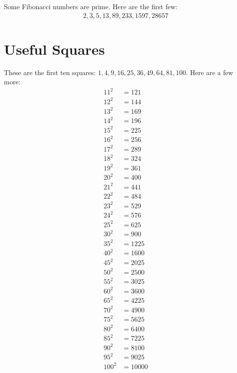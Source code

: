 \documentclass[12pt]{article}
\begin{document}
Some Fibonacci numbers are prime. Here are the first few:
\begin{align*}
2, 3, 5, 13, 89, 233, 1597, 28657
\end{align*}

\section*{Useful Squares}
These are the first ten squares: $1, 4, 9, 16, 25, 36, 49, 64, 81, 100$. Here are a few more:
\begin{align*}
11^2  & = 121\\
12^2  & = 144\\
13^2  & = 169\\
14^2  & = 196\\
15^2  & = 225\\
16^2  & = 256\\
17^2  & = 289\\
18^2  & = 324\\
19^2  & = 361\\
20^2  & = 400\\
21^2  & = 441\\
22^2  & = 484\\
23^2  & = 529\\
24^2  & = 576\\
25^2  & = 625\\
30^2  & = 900\\
35^2  & = 1225\\
40^2  & = 1600\\
45^2  & = 2025\\
50^2  & = 2500\\
55^2  & = 3025\\
60^2  & = 3600 \\
65^2  & = 4225\\
70^2  & = 4900\\
75^2  & = 5625\\
80^2  & = 6400\\
85^2  & = 7225\\
90^2  & = 8100\\
95^2  & = 9025\\
100^2 & = 10000
\end{align*}

\newpage
\end{document}

